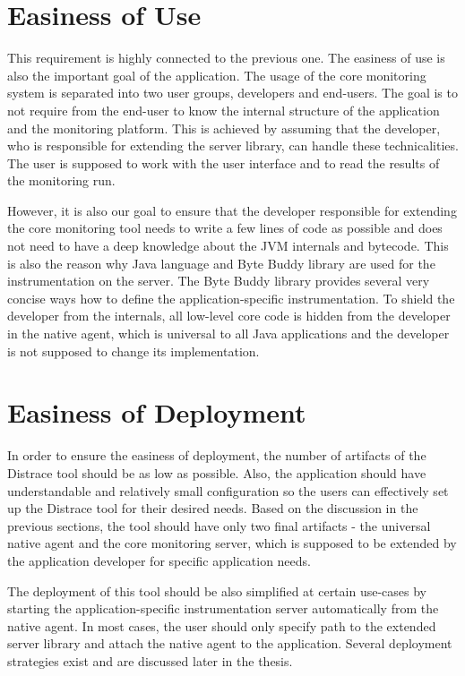 \section{Easiness of Use}
This requirement is highly connected to the previous one. The easiness of use is also the important goal of the application. The usage of the core monitoring system is separated into two user groups, developers and end-users. The goal is to not require from the end-user to know the internal structure of the application and the monitoring platform. This is achieved by assuming that the developer, who is responsible for extending the server library, can handle these technicalities. The user is supposed to work with the user interface and to read the results of the monitoring run. 

However, it is also our goal to ensure that the developer responsible for extending the core monitoring tool needs to write a few lines of code as possible and does not need to have a deep knowledge about the JVM internals and bytecode. This is also the reason why Java language and Byte Buddy library are used for the instrumentation on the server. The Byte Buddy library provides several very concise ways how to define the application-specific instrumentation. To shield the developer from the internals, all low-level core code is hidden from the developer in the native agent, which is universal to all Java applications and the developer is not supposed to change its implementation.

\section{Easiness of Deployment}
In order to ensure the easiness of deployment, the number of artifacts of the Distrace tool should be as low as possible. Also, the application should have understandable and relatively small configuration so the users can effectively set up the Distrace tool for their desired needs. Based on the discussion in the previous sections, the tool should have only two final artifacts - the universal native agent and the core monitoring server, which is supposed to be extended by the application developer for specific application needs.

The deployment of this tool should be also simplified at certain use-cases by starting the application-specific instrumentation server automatically from the native agent. In most cases, the user should only specify path to the extended server library and attach the native agent to the application. Several deployment strategies exist and are discussed later in the thesis.

